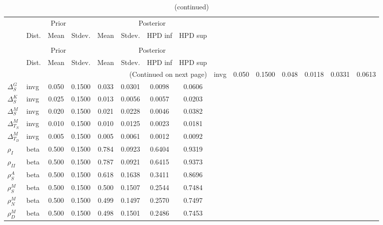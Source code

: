  
\begin{center}
\begin{longtable}{llcccccc} 
\caption{Results from Metropolis-Hastings (parameters)}
 \label{Table:MHPosterior:1}\\
\toprule 
  & \multicolumn{3}{c}{Prior}  &  \multicolumn{4}{c}{Posterior} \\
  \cmidrule(r{.75em}){2-4} \cmidrule(r{.75em}){5-8}
  & Dist. & Mean  & Stdev. & Mean & Stdev. & HPD inf & HPD sup\\
\midrule \endfirsthead 
\caption{(continued)}\\\toprule 
  & \multicolumn{3}{c}{Prior}  &  \multicolumn{4}{c}{Posterior} \\
  \cmidrule(r{.75em}){2-4} \cmidrule(r{.75em}){5-8}
  & Dist. & Mean  & Stdev. & Mean & Stdev. & HPD inf & HPD sup\\
\midrule \endhead 
\bottomrule \multicolumn{8}{r}{(Continued on next page)} \endfoot 
\bottomrule \endlastfoot 
${\Delta^{A}_{S}}$ & invg &   0.050 & 0.1500 &   0.048& 0.0118 &  0.0331 &  0.0613 \\ 
${\Delta^{G}_{S}}$ & invg &   0.050 & 0.1500 &   0.033& 0.0301 &  0.0098 &  0.0606 \\ 
${\Delta^{K}_{S}}$ & invg &   0.025 & 0.1500 &   0.013& 0.0056 &  0.0057 &  0.0203 \\ 
${\Delta^{M}_{S}}$ & invg &   0.020 & 0.1500 &   0.021& 0.0228 &  0.0046 &  0.0382 \\ 
${\Delta^{M}_{T_N}}$ & invg &   0.010 & 0.1500 &   0.010& 0.0125 &  0.0023 &  0.0181 \\ 
${\Delta^{M}_{T_D}}$ & invg &   0.005 & 0.1500 &   0.005& 0.0061 &  0.0012 &  0.0092 \\ 
${\rho_{I}}$ & beta &   0.500 & 0.1500 &   0.784& 0.0923 &  0.6404 &  0.9319 \\ 
${\rho_{II}}$ & beta &   0.500 & 0.1500 &   0.787& 0.0921 &  0.6415 &  0.9373 \\ 
${\rho^{A}_{S}}$ & beta &   0.500 & 0.1500 &   0.618& 0.1638 &  0.3411 &  0.8696 \\ 
${\rho^{M}_{S}}$ & beta &   0.500 & 0.1500 &   0.500& 0.1507 &  0.2544 &  0.7484 \\ 
${\rho^{M}_{N}}$ & beta &   0.500 & 0.1500 &   0.499& 0.1497 &  0.2570 &  0.7497 \\ 
${\rho^{M}_{D}}$ & beta &   0.500 & 0.1500 &   0.498& 0.1501 &  0.2486 &  0.7453 \\ 
\end{longtable}
 \end{center}
